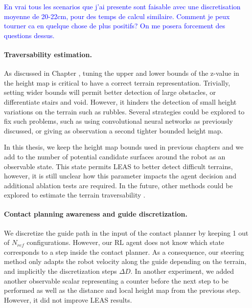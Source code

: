 \textcolor{blue}{En vrai tous les scenarios que j'ai presente sont faisable avec une discretisation moyenne de 20-22cm, pour des temps de calcul similaire. Comment je peux tourner ca en quelque chose de plus positifs? On me posera forcement des questions dessus.}


\paragraph{Traversability estimation.}
As discussed in Chapter \cite{sec:LEAS}, tuning the upper and lower bounds of the z-value in the height map is critical to have a correct terrain representation.
Trivially, setting wider bounds will permit better detection of large obstacles, or differentiate stairs and void. However, it hinders the detection of small height variations on the terrain such as rubbles.
Several strategies could be explored to fix such problems, such as using convolutional neural networks as previously discussed, or giving as observation a second tighter bounded height map.

In this thesis, we keep the height map bounds used in previous chapters and we add to the number of potential candidate surfaces around the robot as an observable state.
This state permits LEAS to better detect difficult terrains, however, it is still unclear how this parameter impacts the agent decision and additional ablation tests are required.
In the future, other methods could be explored to estimate the terrain traversability \cite{lin_traversability_2018, brandao_multimode_2019}.

\paragraph{Contact planning awareness and guide discretization.}
We discretize the guide path in the input of the contact planner by keeping 1 out of $N_{ref}$ configurations.
However, our RL agent does not know which state corresponds to a step inside the contact planner.
As a consequence, our steering method only adapts the robot velocity along the guide depending on the terrain, and implicitly the discretization steps $\Delta D$.
In another experiment, we added another observable scalar representing a counter before the next step to be performed as well as the distance and local height map from the previous step. However, it did not improve LEAS results.

